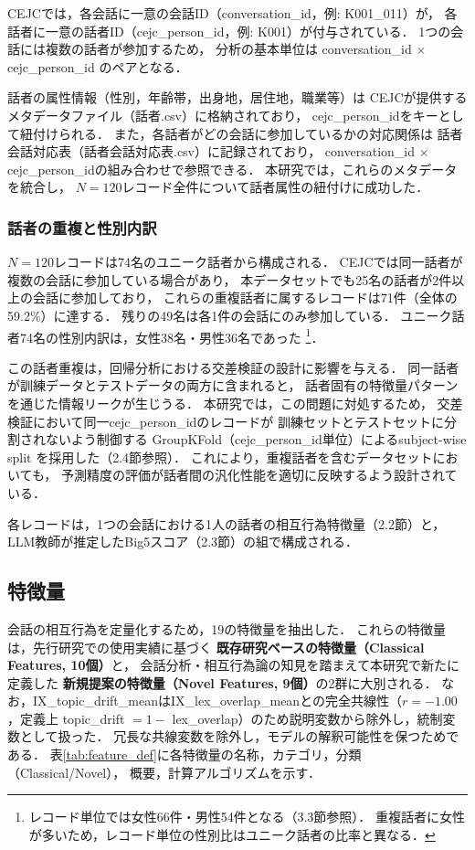 \documentclass[dvipdfmx,11pt,a4paper]{bxjsarticle}
\begin{document}
CEJCでは，各会話に一意の会話ID（conversation\_id，例: K001\_011）が，
各話者に一意の話者ID（cejc\_person\_id，例: K001）が付与されている．
1つの会話には複数の話者が参加するため，
分析の基本単位は conversation\_id $\times$ cejc\_person\_id のペアとなる．

話者の属性情報（性別，年齢帯，出身地，居住地，職業等）は
CEJCが提供するメタデータファイル（話者.csv）に格納されており，
cejc\_person\_idをキーとして紐付けられる．
また，各話者がどの会話に参加しているかの対応関係は
話者会話対応表（話者会話対応表.csv）に記録されており，
conversation\_id $\times$ cejc\_person\_idの組み合わせで参照できる．
本研究では，これらのメタデータを統合し，
$N = 120$レコード全件について話者属性の紐付けに成功した．

\subsubsection{話者の重複と性別内訳}

$N = 120$レコードは74名のユニーク話者から構成される．
CEJCでは同一話者が複数の会話に参加している場合があり，
本データセットでも25名の話者が2件以上の会話に参加しており，
これらの重複話者に属するレコードは71件（全体の59.2\%）に達する．
残りの49名は各1件の会話にのみ参加している．
ユニーク話者74名の性別内訳は，女性38名・男性36名であった%
\footnote{レコード単位では女性66件・男性54件となる（3.3節参照）．
重複話者に女性が多いため，レコード単位の性別比はユニーク話者の比率と異なる．}．

この話者重複は，回帰分析における交差検証の設計に影響を与える．
同一話者が訓練データとテストデータの両方に含まれると，
話者固有の特徴量パターンを通じた情報リークが生じうる．
本研究では，この問題に対処するため，
交差検証において同一cejc\_person\_idのレコードが
訓練セットとテストセットに分割されないよう制御する
GroupKFold（cejc\_person\_id単位）によるsubject-wise split を採用した（2.4節参照）．
これにより，重複話者を含むデータセットにおいても，
予測精度の評価が話者間の汎化性能を適切に反映するよう設計されている．

各レコードは，1つの会話における1人の話者の相互行為特徴量（2.2節）と，
LLM教師が推定したBig5スコア（2.3節）の組で構成される．

\subsection{特徴量}
\label{sec:features}

会話の相互行為を定量化するため，19の特徴量を抽出した．
これらの特徴量は，先行研究での使用実績に基づく
\textbf{既存研究ベースの特徴量（Classical Features, 10個）}と，
会話分析・相互行為論の知見を踏まえて本研究で新たに定義した
\textbf{新規提案の特徴量（Novel Features, 9個）}の2群に大別される．
なお，IX\_topic\_drift\_meanはIX\_lex\_overlap\_meanとの完全共線性（$r = -1.00$，定義上 topic\_drift $= 1 -$ lex\_overlap）のため説明変数から除外し，統制変数として扱った．
冗長な共線変数を除外し，モデルの解釈可能性を保つためである．
表\ref{tab:feature_def}に各特徴量の名称，カテゴリ，分類（Classical/Novel），
概要，計算アルゴリズムを示す．
\end{document}
